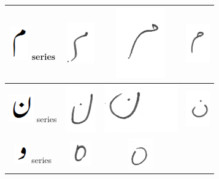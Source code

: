\begin{table}[h]
\begin{tabular}{@{}cccc@{}}
\hline
\includegraphics[scale=0.15]{meem_orig} series & \includegraphics[scale=0.15]{207} & 
\includegraphics[scale=0.10]{208} & \includegraphics[scale=0.15]{209} \\
\hline
\includegraphics[scale=0.15]{noon_orig} series & \includegraphics[scale=0.15]{210} & \includegraphics[scale=0.15]{211} &
\includegraphics[scale=0.15]{212} \\
\hline
\includegraphics[scale=0.15]{wao_orig} series & \includegraphics[scale=0.15]{213} & \includegraphics[scale=0.15]{214} &

\end{tabular}
\end{table}
